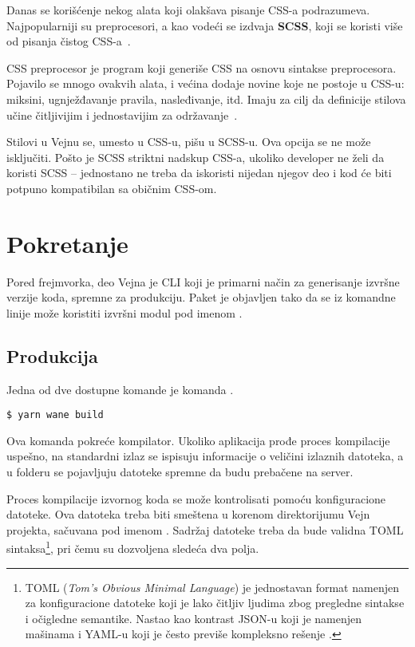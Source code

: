 Danas se korišćenje nekog alata koji olakšava pisanje CSS-a podrazumeva.
Najpopularniji su preprocesori, a kao vodeći se izdvaja \textbf{SCSS}, koji se koristi više od pisanja čistog CSS-a~\cite{sojs:2017}.

CSS preprocesor je program koji generiše CSS na osnovu sintakse preprocesora.
Pojavilo se mnogo ovakvih alata, i većina dodaje novine koje ne postoje u CSS-u: miksini, ugnježđavanje pravila, nasleđivanje, itd.
Imaju za cilj da definicije stilova učine čitljivijim i jednostavijim za održavanje~\cite{mdn:glossary:css-preprocessor}.

Stilovi u Vejnu se, umesto u CSS-u, pišu u SCSS-u.
Ova opcija se ne može isključiti.
Pošto je SCSS striktni nadskup CSS-a, ukoliko developer ne želi da koristi SCSS -- jednostano ne treba da iskoristi nijedan njegov deo i kod će biti potpuno kompatibilan sa običnim CSS-om.

\section{Pokretanje}

Pored frejmvorka, deo Vejna je CLI koji je primarni način za generisanje izvršne verzije koda, spremne za produkciju.
Paket je objavljen tako da se iz komandne linije može koristiti izvršni modul pod imenom .

\subsection{Produkcija}

Jedna od dve dostupne komande je komanda .

\begin{verbatim}
$ yarn wane build
\end{verbatim}

Ova komanda pokreće kompilator.
Ukoliko aplikacija prođe proces kompilacije uspešno, na standardni izlaz se ispisuju informacije o veličini izlaznih datoteka, a u  folderu se pojavljuju datoteke spremne da budu prebačene na server.

Proces kompilacije izvornog koda se može kontrolisati pomoću konfiguracione datoteke.
Ova datoteka treba biti smeštena u korenom direktorijumu Vejn projekta, sačuvana pod imenom .
Sadržaj datoteke treba da bude validna TOML sintaksa\footnote{TOML (\textsl{Tom's Obvious Minimal Language}) je jednostavan format namenjen za konfiguracione datoteke koji je lako čitljiv ljudima zbog pregledne sintakse i očigledne semantike. Nastao kao kontrast JSON-u koji je namenjen mašinama i YAML-u koji je često previše kompleksno rešenje \cite{toml:spec}.}, pri čemu su dozvoljena sledeća dva polja.

